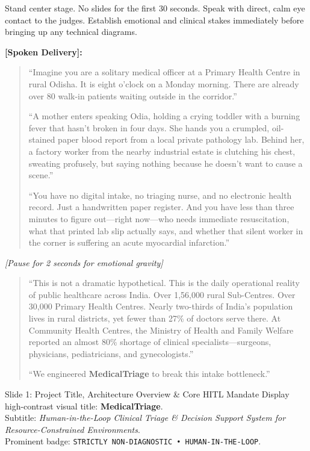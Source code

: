 \documentclass[11pt,a4paper]{article}
\begin{document}
\begin{stagenote}
Stand center stage. No slides for the first 30 seconds. Speak with direct, calm eye contact to the judges. Establish emotional and clinical stakes immediately before bringing up any technical diagrams.
\end{stagenote}

\vspace{1mm}
\noindent \textbf{[Spoken Delivery]:}
\begin{quote}
``Imagine you are a solitary medical officer at a Primary Health Centre in rural Odisha. It is eight o'clock on a Monday morning. There are already over 80 walk-in patients waiting outside in the corridor.''

``A mother enters speaking Odia, holding a crying toddler with a burning fever that hasn't broken in four days. She hands you a crumpled, oil-stained paper blood report from a local private pathology lab. Behind her, a factory worker from the nearby industrial estate is clutching his chest, sweating profusely, but saying nothing because he doesn't want to cause a scene.''

``You have no digital intake, no triaging nurse, and no electronic health record. Just a handwritten paper register. And you have less than three minutes to figure out---right now---who needs immediate resuscitation, what that printed lab slip actually says, and whether that silent worker in the corner is suffering an acute myocardial infarction.''
\end{quote}

\noindent \textit{[Pause for 2 seconds for emotional gravity]}

\begin{quote}
``This is not a dramatic hypothetical. This is the daily operational reality of public healthcare across India. Over 1,56,000 rural Sub-Centres. Over 30,000 Primary Health Centres. Nearly two-thirds of India's population lives in rural districts, yet fewer than 27\% of doctors serve there. At Community Health Centres, the Ministry of Health and Family Welfare reported an almost 80\% shortage of clinical specialists---surgeons, physicians, pediatricians, and gynecologists.''

``We engineered \textbf{MedicalTriage} to break this intake bottleneck.''
\end{quote}

\begin{slidebox}{Slide 1: Project Title, Architecture Overview \& Core HITL Mandate}
Display high-contrast visual title: \textbf{MedicalTriage}.\\
Subtitle: \textit{Human-in-the-Loop Clinical Triage \& Decision Support System for Resource-Constrained Environments}.\\
Prominent badge: \texttt{STRICTLY NON-DIAGNOSTIC • HUMAN-IN-THE-LOOP}.
\end{slidebox}
\end{document}

